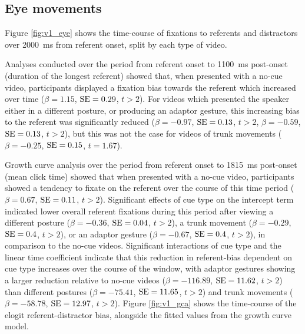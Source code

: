 \documentclass[a4paper,man,natbib]{apa6}
\newcommand{\resultsLM}[3]{$\beta = #1$, $\textnormal{SE} = #2$, $t #3$}
\begin{document}
\subsection{Eye movements}
Figure \ref{fig:v1_eye} shows the time-course of fixations to referents and distractors over 2000~ms from referent onset, split by each type of video.

Analyses conducted over the period from referent onset to 1100~ms post-onset (duration of the longest referent) showed that, when presented with a no-cue video, participants displayed a fixation bias towards the referent which increased over time (\resultsLM{1.15}{0.29}{>2}). %
For videos which presented the speaker either in a different posture, or producing an adaptor gesture, this increasing bias to the referent was significantly reduced
(\resultsLM{-0.97}{0.13}{>2}, \resultsLM{-0.59}{0.13}{>2}), but this was not the case for videos of trunk movements (\resultsLM{-0.25}{0.15}{=1.67}). 

Growth curve analysis over the period from referent onset to 1815~ms post-onset (mean click time) showed that when presented with a no-cue video, participants showed a tendency to fixate on the referent over the course of this time period (\resultsLM{0.67}{0.11}{>2}). %
Significant effects of cue type on the intercept term indicated lower overall referent fixations during this period after viewing a different posture (\resultsLM{-0.36}{0.04}{>2}), a trunk movement (\resultsLM{-0.29}{0.4}{>2}), or an adaptor gesture (\resultsLM{-0.67}{0.4}{>2}), in comparison to the no-cue videos.
Significant interactions of cue type and the linear time coefficient indicate that this reduction in referent-bias dependent on cue type increases over the course of the window, with adaptor gestures showing a larger reduction relative to no-cue videos (\resultsLM{-116.89}{11.62}{>2}) than different postures (\resultsLM{-75.41}{11.65}{>2}) and trunk movements (\resultsLM{-58.78}{12.97}{>2}). 
Figure \ref{fig:v1_gca} shows the time-course of the elogit referent-distractor bias, alongside the fitted values from the growth curve model. 
\end{document}
